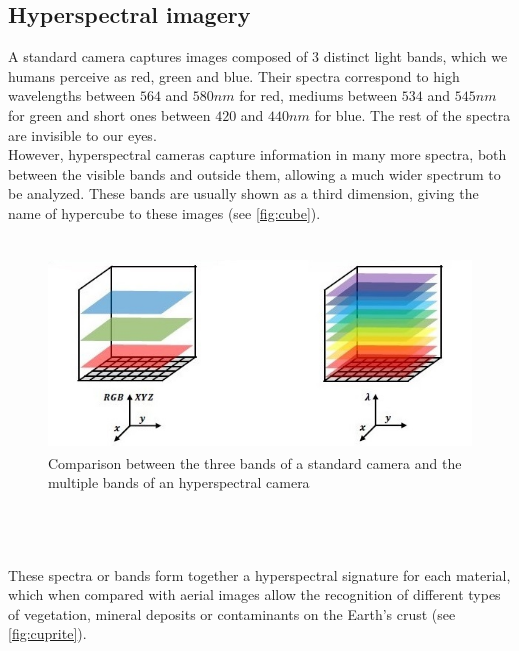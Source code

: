 \subsection{Hyperspectral imagery}
A standard camera captures images composed of 3 distinct light bands, which we humans perceive as red, green and blue. Their spectra correspond to high wavelengths between $564$ and $580 nm$ for red, mediums between $534$ and $545 nm$ for green and short ones between $420$ and $440 nm$ for blue. The rest of the spectra are invisible to our eyes.
\\
However, hyperspectral cameras capture information in many more spectra, both between the visible bands and outside them, allowing a much wider spectrum to be analyzed. These bands are usually shown as a third dimension, giving the name of hypercube to these images (see \autoref{fig:cube}).
\\
\\
\begin{figure}[h!]
\centering
\includegraphics[height=2in]{figures/rgb_vs_hsi.jpeg}
\caption[Comparison between a standard and a hyperspectral image]{Comparison between the three bands of a standard camera and the multiple bands of an hyperspectral camera}
  \label{fig:cube}
\end{figure}
\\
\\
\\
These spectra or bands form together a hyperspectral signature for each material, which when compared with aerial images allow the recognition of different types of vegetation, mineral deposits or contaminants on the Earth's crust (see \autoref{fig:cuprite}).
\\
\\

